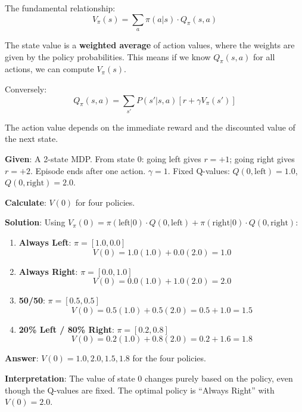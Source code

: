 \documentclass[11pt,a4paper]{article}
\begin{document}
The fundamental relationship:
\[
V_\pi(s) = \sum_a \pi(a|s) \cdot Q_\pi(s, a)
\]

The state value is a \textbf{weighted average} of action values, where the weights are given by the policy probabilities. This means if we know $Q_\pi(s, a)$ for all actions, we can compute $V_\pi(s)$.

Conversely:
\[
Q_\pi(s, a) = \sum_{s'} P(s'|s, a) [r + \gamma V_\pi(s')]
\]

The action value depends on the immediate reward and the discounted value of the next state.

\begin{tcolorbox}[colback=blue!5!white,colframe=blue!75!black,title=\textbf{Worked Example 19: Computing $V(0)$ Under Different Policies}]
\textbf{Given}: A 2-state MDP. From state 0: going left gives $r = +1$; going right gives $r = +2$. Episode ends after one action. $\gamma = 1$. Fixed Q-values: $Q(0, \text{left}) = 1.0$, $Q(0, \text{right}) = 2.0$.

\textbf{Calculate}: $V(0)$ for four policies.

\textbf{Solution}:
Using $V_\pi(0) = \pi(\text{left}|0) \cdot Q(0,\text{left}) + \pi(\text{right}|0) \cdot Q(0,\text{right})$:

\begin{enumerate}
    \item \textbf{Always Left}: $\pi = [1.0, 0.0]$
    \[
    V(0) = 1.0(1.0) + 0.0(2.0) = 1.0
    \]
    \item \textbf{Always Right}: $\pi = [0.0, 1.0]$
    \[
    V(0) = 0.0(1.0) + 1.0(2.0) = 2.0
    \]
    \item \textbf{50/50}: $\pi = [0.5, 0.5]$
    \[
    V(0) = 0.5(1.0) + 0.5(2.0) = 0.5 + 1.0 = 1.5
    \]
    \item \textbf{20\% Left / 80\% Right}: $\pi = [0.2, 0.8]$
    \[
    V(0) = 0.2(1.0) + 0.8(2.0) = 0.2 + 1.6 = 1.8
    \]
\end{enumerate}

\textbf{Answer}: $V(0) = 1.0, 2.0, 1.5, 1.8$ for the four policies.

\textbf{Interpretation}: The value of state 0 changes purely based on the policy, even though the Q-values are fixed. The optimal policy is ``Always Right'' with $V(0) = 2.0$.
\end{tcolorbox}
\end{document}
